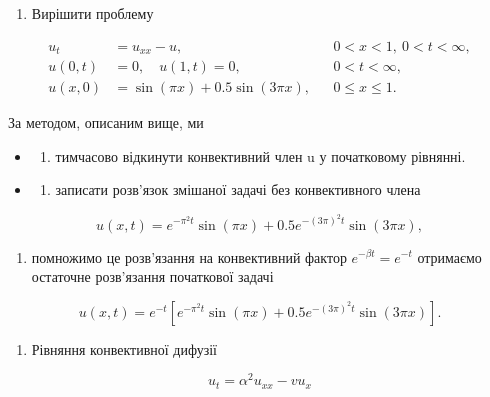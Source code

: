 \documentclass[
  ukrainian,
]{article}
\providecommand{\tightlist}{%
  \setlength{\itemsep}{0pt}\setlength{\parskip}{0pt}}
\begin{document}
\begin{enumerate}
\def\labelenumi{\arabic{enumi}.}
\tightlist
\item
  Вирішити проблему
\end{enumerate}

\[
\begin{aligned}
u_t &= u_{xx} - u, && 0 < x < 1,\ 0 < t < \infty, \\
u(0,t) &= 0,\quad u(1,t) = 0, && 0 < t < \infty, \\
u(x,0) &= \sin(\pi x) + 0.5\sin(3\pi x), && 0 \leqslant x \leqslant 1.
\end{aligned}
\]

За методом, описаним вище, ми

\begin{itemize}
\tightlist
\item
  \begin{enumerate}
  \def\labelenumi{\alph{enumi})}
  \tightlist
  \item
    тимчасово відкинути конвективний член u у початковому рівнянні.
  \end{enumerate}
\item
  \begin{enumerate}
  \def\labelenumi{\alph{enumi})}
  \setcounter{enumi}{1}
  \tightlist
  \item
    записати розв'язок змішаної задачі без конвективного члена
  \end{enumerate}
\end{itemize}

\[
u(x, t) = e^{-\pi^2 t} \sin(\pi x) + 0.5e^{-(3\pi)^2 t} \sin(3\pi x),
\]

\begin{enumerate}
\def\labelenumi{\alph{enumi})}
\setcounter{enumi}{2}
\tightlist
\item
  помножимо це розв'язання на конвективний фактор
  \(e^{-\beta t}=e^{-t}\) отримаємо остаточне розв'язання початкової
  задачі
\end{enumerate}

\[
u(x, t) = e^{-t} \left[ e^{-\pi^2 t} \sin(\pi x) + 0.5e^{-(3\pi)^2 t} \sin(3\pi x) \right].
\]

\begin{enumerate}
\def\labelenumi{\arabic{enumi}.}
\setcounter{enumi}{1}
\tightlist
\item
  Рівняння конвективної дифузії
\end{enumerate}

\[
u_t = \alpha^2 u_{xx} - v u_x
\]
\end{document}
